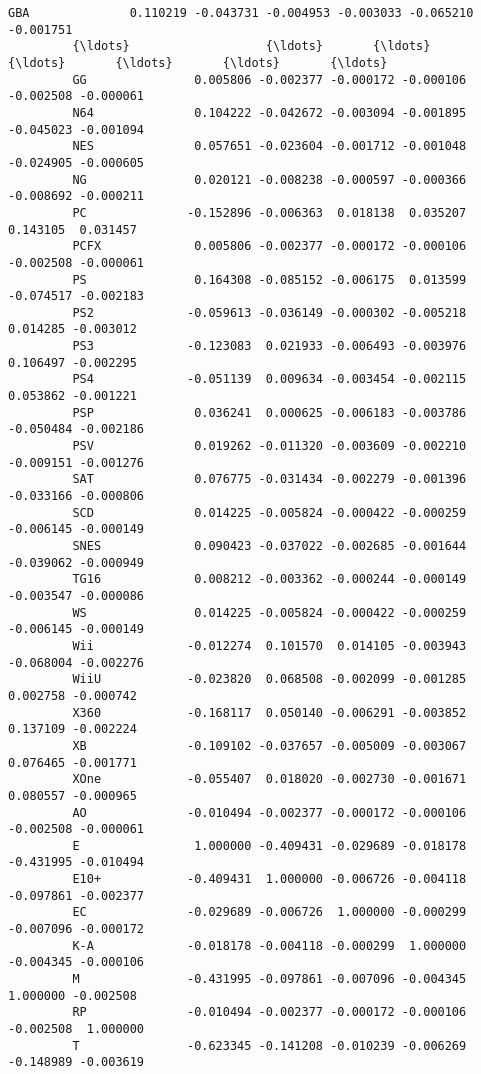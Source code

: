 \documentclass[11pt]{article}
\begin{document}
\begin{Verbatim}[commandchars=\\\{\}]
         GBA              0.110219 -0.043731 -0.004953 -0.003033 -0.065210 -0.001751   
         {\ldots}                   {\ldots}       {\ldots}       {\ldots}       {\ldots}       {\ldots}       {\ldots}   
         GG               0.005806 -0.002377 -0.000172 -0.000106 -0.002508 -0.000061   
         N64              0.104222 -0.042672 -0.003094 -0.001895 -0.045023 -0.001094   
         NES              0.057651 -0.023604 -0.001712 -0.001048 -0.024905 -0.000605   
         NG               0.020121 -0.008238 -0.000597 -0.000366 -0.008692 -0.000211   
         PC              -0.152896 -0.006363  0.018138  0.035207  0.143105  0.031457   
         PCFX             0.005806 -0.002377 -0.000172 -0.000106 -0.002508 -0.000061   
         PS               0.164308 -0.085152 -0.006175  0.013599 -0.074517 -0.002183   
         PS2             -0.059613 -0.036149 -0.000302 -0.005218  0.014285 -0.003012   
         PS3             -0.123083  0.021933 -0.006493 -0.003976  0.106497 -0.002295   
         PS4             -0.051139  0.009634 -0.003454 -0.002115  0.053862 -0.001221   
         PSP              0.036241  0.000625 -0.006183 -0.003786 -0.050484 -0.002186   
         PSV              0.019262 -0.011320 -0.003609 -0.002210 -0.009151 -0.001276   
         SAT              0.076775 -0.031434 -0.002279 -0.001396 -0.033166 -0.000806   
         SCD              0.014225 -0.005824 -0.000422 -0.000259 -0.006145 -0.000149   
         SNES             0.090423 -0.037022 -0.002685 -0.001644 -0.039062 -0.000949   
         TG16             0.008212 -0.003362 -0.000244 -0.000149 -0.003547 -0.000086   
         WS               0.014225 -0.005824 -0.000422 -0.000259 -0.006145 -0.000149   
         Wii             -0.012274  0.101570  0.014105 -0.003943 -0.068004 -0.002276   
         WiiU            -0.023820  0.068508 -0.002099 -0.001285  0.002758 -0.000742   
         X360            -0.168117  0.050140 -0.006291 -0.003852  0.137109 -0.002224   
         XB              -0.109102 -0.037657 -0.005009 -0.003067  0.076465 -0.001771   
         XOne            -0.055407  0.018020 -0.002730 -0.001671  0.080557 -0.000965   
         AO              -0.010494 -0.002377 -0.000172 -0.000106 -0.002508 -0.000061   
         E                1.000000 -0.409431 -0.029689 -0.018178 -0.431995 -0.010494   
         E10+            -0.409431  1.000000 -0.006726 -0.004118 -0.097861 -0.002377   
         EC              -0.029689 -0.006726  1.000000 -0.000299 -0.007096 -0.000172   
         K-A             -0.018178 -0.004118 -0.000299  1.000000 -0.004345 -0.000106   
         M               -0.431995 -0.097861 -0.007096 -0.004345  1.000000 -0.002508   
         RP              -0.010494 -0.002377 -0.000172 -0.000106 -0.002508  1.000000   
         T               -0.623345 -0.141208 -0.010239 -0.006269 -0.148989 -0.003619   
         

\end{Verbatim}
\end{document}
